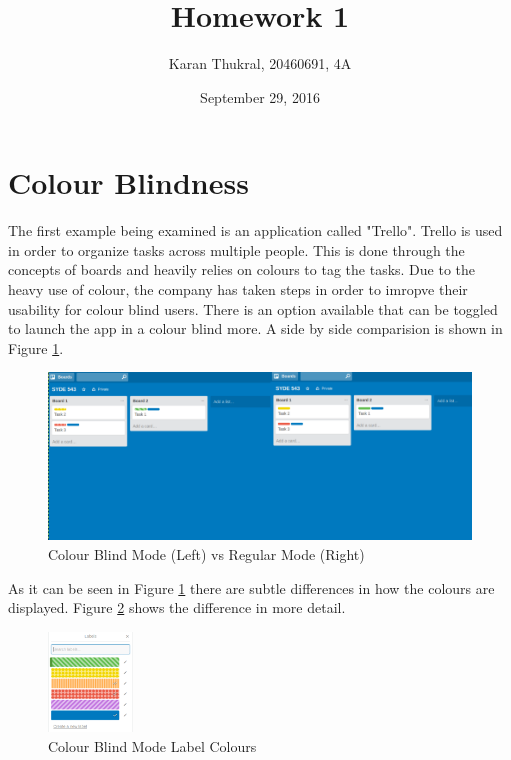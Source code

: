 \documentclass[12pt]{article}
\title{Homework 1}
\author{Karan Thukral, 20460691, 4A}
\date{September 29, 2016}
\begin{document}
	\makereporttitle

	\tableofcontents
	\newpage

	\startarabicpagenumbers

	\section{Colour Blindness}
	The first example being examined is an application called "Trello". Trello is used in order to organize tasks across multiple people. This is done through the concepts of boards and heavily relies on colours to tag the tasks. Due to the heavy use of colour, the company has taken steps in order to imropve their usability for colour blind users. There is an option available that can be toggled to launch the app in a colour blind more. A side by side comparision is shown in Figure \ref{trelloimg}.
	
	\begin{figure}[!ht]
		\centering
		\includegraphics[width=1.0\textwidth]{trelloImage}
		\caption{Colour Blind Mode (Left) vs Regular Mode (Right)}
		\label{trelloimg}
	\end{figure}
	
	As it can be seen in Figure \ref{trelloimg} there are subtle differences in how the colours are displayed. Figure \ref{trelloLabels} shows the difference in more detail.
	
	\begin{figure}[!ht]
		\centering
		\includegraphics[width=0.2\textwidth]{trelloLabels}
		\caption{Colour Blind Mode Label Colours}
		\label{trelloLabels}
	\end{figure}
	
\end{document}
